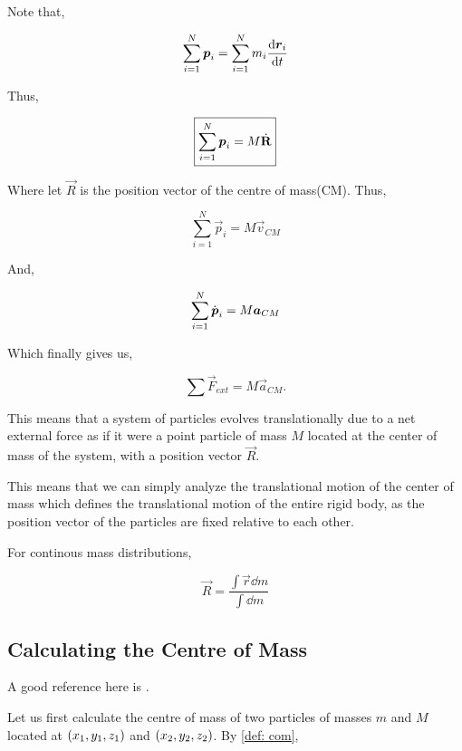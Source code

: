 Note that, 

\begin{equation*}
    \sum_{i=1}^N \boldsymbol{p}_i = \sum_{i=1}^N m_i \dv{\boldsymbol{r}_i}{t}
\end{equation*}

Thus,

\begin{equation}
    \boxed{\sum_{i=1}^N \boldsymbol{p}_i = M\dot{\mathbf{R}}}
\end{equation}

Where let \(\vec{R}\) is the position vector of the centre of mass(CM). Thus, 

\begin{equation*}
    {\sum_{i=1}^N \vec{p}_i = M\vec{v}_{CM}}
\end{equation*}

And, 

\begin{equation*}
    {\sum_{i=1}^N \dot{\boldsymbol{p}}_i = M\boldsymbol{a}_{CM}}
\end{equation*}

Which finally gives us,

\begin{equation}
    \boxed{\sum \Vec{F}_{ext} = M\vec{a}_{CM}.}
\end{equation}

This means that a system of particles evolves translationally due to a net external force as if
it were a point particle of mass \(M\) located at the center of mass of the system, with 
a position vector \(\Vec{R}\).

This means that we can simply analyze the translational motion of the center of mass which 
defines the translational motion of the entire rigid body, as the 
position vector of the particles are fixed relative to each other.

For continous mass distributions, 

\begin{equation}
    \Vec{R} = \frac{\int\vec{r}\dd{m}}{\int\dd{m}}
\end{equation}

\subsection{Calculating the Centre of Mass}

A good reference here is \cite{wangricardo}.

Let us first calculate the centre of mass of two particles of masses 
\(m\) and \(M\) located at \(\qty(x_1, y_1, z_1)\) and \(\qty(x_2, y_2, z_2)\). 
By \cref{def: com}, 

